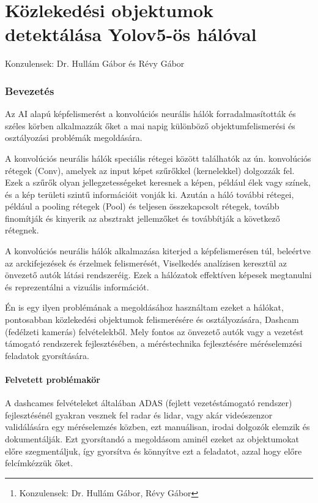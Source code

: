 \documentclass[12pt,oneside,a4paper]{article}
\title{\titletext}
\author{Nyilas Péter\thanks{Konzulensek: Dr. Hullám Gábor, Révy Gábor}}
\date{\today}
\theoremstyle{remark}
\begin{document}
\maketitle
\newpage
\tableofcontents\label{ossz:tartalomjegyzek}
\newpage





\part{Közlekedési objektumok detektálása Yolov5-ös hálóval}\label{part:kozlekedesi-objektumok-detektalasa-yolov5-os-haloval}
Konzulensek:
Dr. Hullám Gábor és
Révy Gábor
\section{Bevezetés}\label{sec:bevezetes2}

Az AI alapú képfelismerést a konvolúciós neurális hálók forradalmasították és széles körben alkalmazzák őket a mai
napig különböző objektumfelismerési és osztályozási problémák megoldására.

A konvolúciós neurális hálók speciális rétegei között találhatók az ún. konvolúciós rétegek (Conv), amelyek az input képet
szűrőkkel (kernelekkel) dolgozzák fel. Ezek a szűrők olyan jellegzetességeket keresnek a képen, például élek vagy színek,
és a kép területi szintű információit vonják ki. Azután a háló további rétegei, például a pooling rétegek (Pool) és
teljesen összekapcsolt rétegek, tovább finomítják és kinyerik az absztrakt jellemzőket és továbbítják a következő rétegnek.


A konvolúciós neurális hálók alkalmazása kiterjed a képfelismerésen túl, beleértve az arckifejezések és érzelmek
felismerését, Viselkedés analízisen keresztül az önvezető autók látási rendszeréig. Ezek a hálózatok effektíven képesek
megtanulni és reprezentálni a vizuális információt.


Én is egy ilyen problémának a megoldásához használtam ezeket a hálókat, pontosabban közlekedési objektumok felismerésére
és osztályozására, Dashcam (fedélzeti kamerás) felvételekből.
Mely fontos az önvezető autók vagy a vezetést támogató rendszerek fejlesztésében, a méréstechnika fejlesztésére
méréselemzési feladatok gyorsítására.

\subsection{Felvetett problémakör}\label{subsec:felvetett-problemakor}
A dashcames felvételeket általában ADAS (fejlett vezetéstámogató rendszer) fejlesztésénél gyakran vesznek fel radar és lidar,
vagy akár videószenzor validálására egy méréselemzés közben, ezt manuálisan, irodai dolgozók elemzik és dokumentálják.
Ezt gyorsítandó a megoldásom aminél ezeket az objektumokat előre szegmentáljuk, így gyorsítva és könnyítve ezt a feladatot,
azzal hogy előre felcímkézzük őket.
\end{document}

